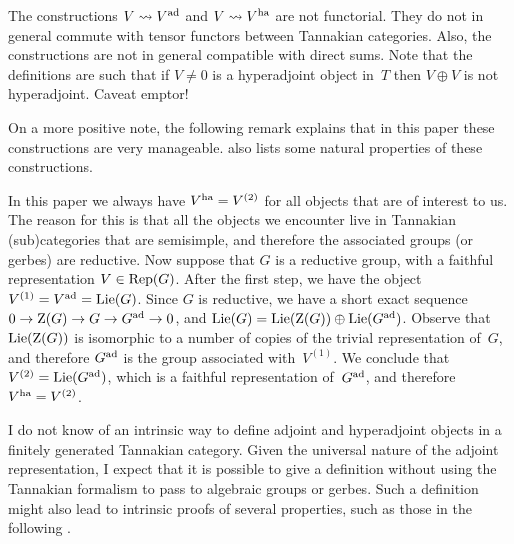 \documentclass[10pt,twoside,leqno]{article}
\numberwithin{equation}{subsection}
\newcommand{\Rep}{\textnormal{Rep}}
\newcommand{\Lie}{\textnormal{Lie}}
\newcommand{\ad}{\textnormal{ad}}
\newcommand{\ha}{\textnormal{ha}}
\newcommand{\Zentrum}{\textnormal{Z}}
\begin{document}
\begin{remark} %
 The constructions $V \rightsquigarrow V^\ad$ and $V \rightsquigarrow V^\ha$
 are not functorial.
 They do not in general commute with
 tensor functors between Tannakian categories.
 Also, the constructions are not in general compatible with direct sums.
 Note that the definitions are such that
 if $V \ne 0$ is a hyperadjoint object in~$T$
 then $V \oplus V$ is not hyperadjoint.
 Caveat emptor!

 On a more positive note, the following remark explains that in this paper
 these constructions are very manageable.
  also lists some natural properties of these constructions.
\end{remark}

\begin{remark} %
 In this paper we always have $V^\ha = V^{(2)}$
 for all objects that are of interest to us.
 The reason for this is that all the objects we encounter live in
 Tannakian (sub)categories that are semisimple,
 and therefore the associated groups (or gerbes) are reductive.
 Now suppose that $G$ is a reductive group,
 with a faithful representation $V \in \Rep(G)$.
 After the first step, we have the object $V^{(1)} = V^\ad = \Lie(G)$.
 Since $G$ is reductive, we have a short exact sequence
 $0 \to \Zentrum(G) \to G \to G^\ad \to 0$,
 and $\Lie(G) = \Lie(\Zentrum(G)) \oplus \Lie(G^\ad)$.
 Observe that $\Lie(\Zentrum(G))$ is isomorphic
 to a number of copies of the trivial representation of~$G$,
 and therefore $G^\ad$ is the group associated with~$V^{(1)}$.
 We conclude that $V^{(2)} = \Lie(G^\ad)$,
 which is a faithful representation of~$G^\ad$,
 and therefore $V^\ha = V^{(2)}$.
\end{remark}

\begin{remark} %
 I do not know of an intrinsic way to define
 adjoint and hyperadjoint objects in a finitely generated Tannakian category.
 Given the universal nature of the adjoint representation,
 I expect that it is possible to give a definition
 without using the Tannakian formalism to pass to algebraic groups or gerbes.
 Such a definition might also lead to intrinsic proofs of several properties,
 such as those in the following .
\end{remark}
\end{document}
